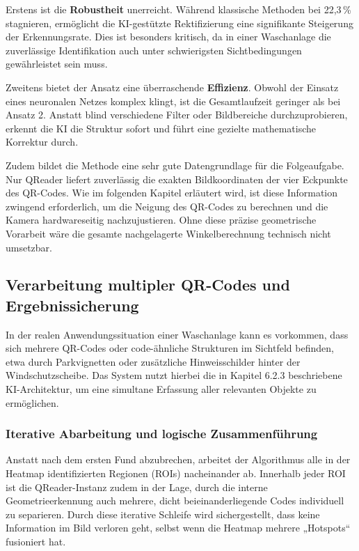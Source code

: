 \documentclass[
    a4paper,        %
    11pt,           %
    ngerman,        %
    parskip=half,   %
    listof=totoc,   %
    bibliography=totoc %
]{scrartcl}
\begin{document}
Erstens ist die \textbf{Robustheit} unerreicht. Während klassische Methoden bei 22,3\,\% stagnieren, ermöglicht die KI-gestützte Rektifizierung eine signifikante Steigerung der Erkennungsrate. Dies ist besonders kritisch, da in einer Waschanlage die zuverlässige Identifikation auch unter schwierigsten Sichtbedingungen gewährleistet sein muss.

Zweitens bietet der Ansatz eine überraschende \textbf{Effizienz}. Obwohl der Einsatz eines neuronalen Netzes komplex klingt, ist die Gesamtlaufzeit geringer als bei Ansatz 2. Anstatt blind verschiedene Filter oder Bildbereiche \glqq durchzuprobieren\grqq, erkennt die KI die Struktur sofort und führt eine gezielte mathematische Korrektur durch.

Zudem bildet die Methode eine sehr gute Datengrundlage für die Folgeaufgabe. Nur QReader liefert zuverlässig die exakten Bildkoordinaten der vier Eckpunkte des QR-Codes. Wie im folgenden Kapitel erläutert wird, ist diese Information zwingend erforderlich, um die Neigung des QR-Codes zu berechnen und die Kamera hardwareseitig nachzujustieren. Ohne diese präzise geometrische Vorarbeit wäre die gesamte nachgelagerte Winkelberechnung technisch nicht umsetzbar.


\subsection{Verarbeitung multipler QR-Codes und Ergebnissicherung}

In der realen Anwendungssituation einer Waschanlage kann es vorkommen, dass sich mehrere QR-Codes oder code-ähnliche Strukturen im Sichtfeld befinden, etwa durch Parkvignetten oder zusätzliche Hinweisschilder hinter der Windschutzscheibe. Das System nutzt hierbei die in Kapitel 6.2.3 beschriebene KI-Architektur, um eine simultane Erfassung aller relevanten Objekte zu ermöglichen.

\subsubsection{Iterative Abarbeitung und logische Zusammenführung}

Anstatt nach dem ersten Fund abzubrechen, arbeitet der Algorithmus alle in der Heatmap identifizierten Regionen (ROIs) nacheinander ab. Innerhalb jeder ROI ist die QReader-Instanz zudem in der Lage, durch die interne Geometrieerkennung auch mehrere, dicht beieinanderliegende Codes individuell zu separieren. Durch diese iterative Schleife wird sichergestellt, dass keine Information im Bild verloren geht, selbst wenn die Heatmap mehrere „Hotspots“ fusioniert hat.
\end{document}
